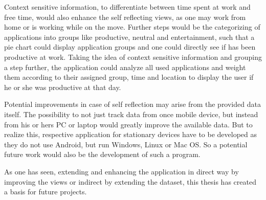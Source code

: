 Context  sensitive information, to differentiate between time spent at work and free time, would also enhance the self reflecting views, as one may work from home or is working while on the move. Further steps would be the categorizing of applications into groups like productive, neutral and entertainment, such that a pie chart could display application groups and one could directly see if has been productive at work. Taking the idea of context sensitive information and grouping a step further, the application could analyze all used applications and weight them according to their assigned group, time and location to display the user if he or she was productive at that day.

Potential  improvements in case of self reflection may arise from the provided data itself. The possibility to not just track data from once mobile device, but instead from his or hers PC or laptop would greatly improve the available data. But to realize this, respective application for stationary devices have to be developed as they do not use Android, but run Windows, Linux or Mac OS. So a potential future work would also be the development of such a program.

As one has seen, extending and enhancing the application in direct way by improving the views or indirect by extending the dataset, this thesis has created a basis for future projects. 
\newpage